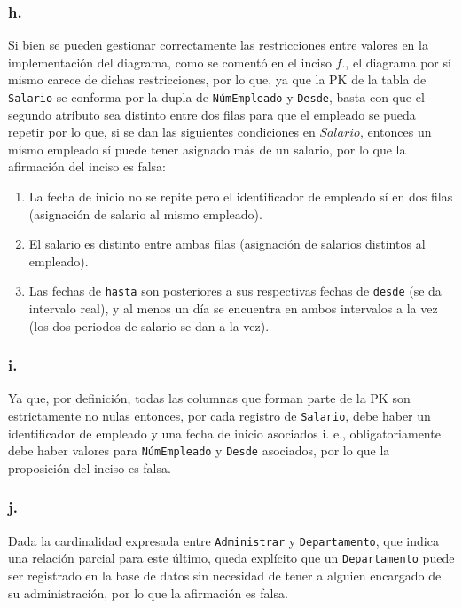 \subsubsection*{h.}
Si bien se pueden gestionar correctamente las restricciones entre valores en la implementación del diagrama, como se comentó en el inciso $f.$, el diagrama por sí mismo carece de dichas restricciones, por lo que, ya que la PK de la tabla de \texttt{Salario} se conforma por la dupla de \texttt{NúmEmpleado} y \texttt{Desde}, basta con que el segundo atributo sea distinto entre dos filas para que el empleado se pueda repetir por lo que, si se dan las siguientes condiciones en $Salario$, entonces un mismo empleado sí puede tener asignado más de un salario, por lo que la afirmación del inciso es falsa:
\begin{enumerate}
    \item La fecha de inicio no se repite pero el identificador de empleado sí en dos filas (asignación de salario al mismo empleado).
    \item El salario es distinto entre ambas filas (asignación de salarios distintos al empleado).
    \item Las fechas de \texttt{hasta} son posteriores a sus respectivas fechas de \texttt{desde} (se da intervalo real), y al menos un día se encuentra en ambos intervalos a la vez (los dos periodos de salario se dan a la vez).
\end{enumerate}

\subsubsection*{i.}
Ya que, por definición, todas las columnas que forman parte de la PK son estrictamente no nulas entonces, por cada registro de \texttt{Salario}, debe haber un identificador de empleado y una fecha de inicio asociados i. e., obligatoriamente debe haber valores para \texttt{NúmEmpleado} y \texttt{Desde} asociados, por lo que la proposición del inciso es falsa.

\subsubsection*{j.}
Dada la cardinalidad expresada entre \texttt{Administrar} y \texttt{Departamento}, que indica una relación parcial para este último, queda explícito que un \texttt{Departamento} puede ser registrado en la base de datos sin necesidad de tener a alguien encargado de su administración, por lo que la afirmación es falsa.